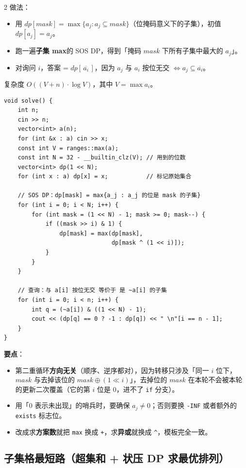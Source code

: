 \begin{multicols*}{2}
		做法：
		\begin{itemize}
			\item 用 $dp[mask] = \max\{a_j : a_j \subseteq mask\}$（位掩码意义下的子集），初值 $dp[a_j] = a_j$。
			\item 跑一遍\textbf{子集 max}的 SOS DP，得到「掩码 $mask$ 下所有子集中最大的 $a_j$」。
			\item 对询问 $i$，答案 = $dp[\,\overline{a_i}\,]$，因为 $a_j$ 与 $a_i$ 按位无交 $\iff a_j \subseteq \overline{a_i}$。
		\end{itemize}

		复杂度 $O((V + n) \cdot \log V)$，其中 $V = \max a_i$。

		\begin{verbatim}
void solve() {
	int n;
	cin >> n;
	vector<int> a(n);
	for (int &x : a) cin >> x;
	const int V = ranges::max(a);
	const int N = 32 - __builtin_clz(V); // 用到的位数
	vector<int> dp(1 << N);
	for (int x : a) dp[x] = x;           // 标记原始集合

	// SOS DP：dp[mask] = max{a_j : a_j 的位是 mask 的子集}
	for (int i = 0; i < N; i++) {
		for (int mask = (1 << N) - 1; mask >= 0; mask--) {
			if ((mask >> i) & 1) {
				dp[mask] = max(dp[mask],
				               dp[mask ^ (1 << i)]);
			}
		}
	}

	// 查询：与 a[i] 按位无交 等价于 是 ~a[i] 的子集
	for (int i = 0; i < n; i++) {
		int q = (~a[i]) & ((1 << N) - 1);
		cout << (dp[q] == 0 ? -1 : dp[q]) << " \n"[i == n - 1];
	}
}
		\end{verbatim}

		\textbf{要点}：
		\begin{itemize}
			\item 第二重循环\textbf{方向无关}（顺序、逆序都对），因为转移只涉及「同一 $i$ 位下，$mask$ 与去掉该位的 $mask \oplus (1 \!\ll\! i)$」，去掉位的 $mask$ 在本轮不会被本轮的更新二次覆盖（它的第 $i$ 位是 $0$，进不了 \texttt{if} 分支）。
			\item 用「0 表示未出现」的哨兵时，要确保 $a_j \neq 0$；否则要换 \texttt{-INF} 或者额外的 \texttt{exists} 标志位。
			\item 改成求\textbf{方案数}就把 \texttt{max} 换成 \texttt{+}，求\textbf{异或}就换成 \texttt{\^{}}，模板完全一致。
		\end{itemize}

		\subsection{子集格最短路（超集和 + 状压 DP 求最优排列）}


\end{multicols*}
